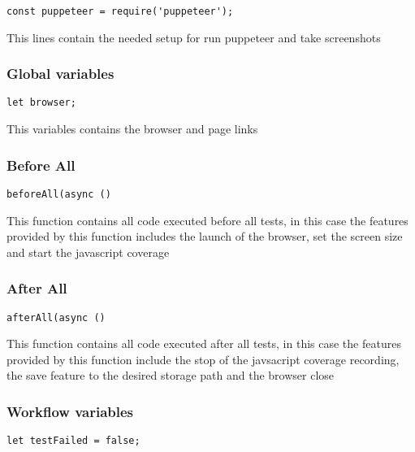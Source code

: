 \documentclass[a4paper]{article}
\begin{document}
\begin{lstlisting}
const puppeteer = require('puppeteer');
\end{lstlisting}

This lines contain the needed setup for run puppeteer and take screenshots

\hypertarget{toc567}{}
\subsubsection{Global variables}

\begin{lstlisting}
let browser;
\end{lstlisting}

This variables contains the browser and page links

\hypertarget{toc568}{}
\subsubsection{Before All}

\begin{lstlisting}
beforeAll(async ()
\end{lstlisting}

This function contains all code executed before all tests, in this case the
features provided by this function includes the launch of the browser, set
the screen size and start the javascript coverage

\hypertarget{toc569}{}
\subsubsection{After All}

\begin{lstlisting}
afterAll(async ()
\end{lstlisting}

This function contains all code executed after all tests, in this case the
features provided by this function include the stop of the javsacript coverage
recording, the save feature to the desired storage path and the browser close

\hypertarget{toc570}{}
\subsubsection{Workflow variables}

\begin{lstlisting}
let testFailed = false;
\end{lstlisting}
\end{document}
